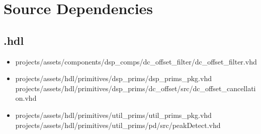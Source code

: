 \newpage

\section*{Source Dependencies}
\subsection*{\comp.hdl}
\begin{itemize}
	\item projects/assets/components/dsp\_comps/dc\_offset\_filter/dc\_offset\_filter.vhd
	\item projects/assets/hdl/primitives/dsp\_prims/dsp\_prims\_pkg.vhd
	     \subitem projects/assets/hdl/primitives/dsp\_prims/dc\_offset/src/dc\_offset\_cancellation.vhd
	\item projects/assets/hdl/primitives/util\_prims/util\_prims\_pkg.vhd
	      \subitem projects/assets/hdl/primitives/util\_prims/pd/src/peakDetect.vhd
\end{itemize}

